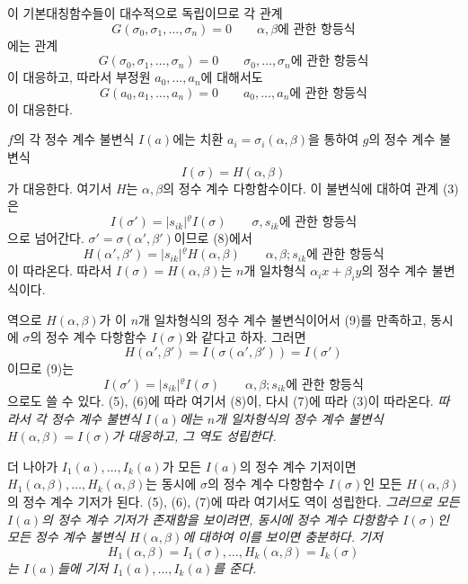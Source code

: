 이 기본대칭함수들이 대수적으로 독립이므로 각 관계
\begin{equation}
\tag{5}
G(\sigma_0,\sigma_1,\ldots,\sigma_n)=0
\qquad\text{\(\alpha,\beta\)에 관한 항등식}
\end{equation}
에는 관계
\begin{equation}
\tag{6}
G(\sigma_0,\sigma_1,\ldots,\sigma_n)=0
\qquad\text{\(\sigma_0,\ldots,\sigma_n\)에 관한 항등식}
\end{equation}
이 대응하고, 따라서 부정원 \(a_0,\ldots,a_n\)에 대해서도
\begin{equation}
\tag{7}
G(a_0,a_1,\ldots,a_n)=0
\qquad\text{\(a_0,\ldots,a_n\)에 관한 항등식}
\end{equation}
이 대응한다.

\(f\)의 각 정수 계수 불변식 \(I(a)\)에는 치환 \(a_i=\sigma_i(\alpha,\beta)\)을 통하여 \(g\)의 정수 계수 불변식
\[
I(\sigma)=H(\alpha,\beta)
\]
가 대응한다. 여기서 \(H\)는 \(\alpha,\beta\)의 정수 계수 다항함수이다. 이 불변식에 대하여 관계 (3)은
\begin{equation}
\tag{8}
I(\sigma')=|s_{ik}|^\varrho I(\sigma)
\qquad\text{\(\sigma,s_{ik}\)에 관한 항등식}
\end{equation}
으로 넘어간다. \(\sigma'=\sigma(\alpha',\beta')\)이므로 (8)에서
\begin{equation}
\tag{9}
H(\alpha',\beta')=|s_{ik}|^\varrho H(\alpha,\beta)
\qquad\text{\(\alpha,\beta;s_{ik}\)에 관한 항등식}
\end{equation}
이 따라온다. 따라서 \(I(\sigma)=H(\alpha,\beta)\)는 \(n\)개 일차형식 \(\alpha_i x+\beta_i y\)의 정수 계수 불변식이다.

역으로 \(H(\alpha,\beta)\)가 이 \(n\)개 일차형식의 정수 계수 불변식이어서 (9)를 만족하고, 동시에 \(\sigma\)의 정수 계수 다항함수 \(I(\sigma)\)와 같다고 하자. 그러면
\[
H(\alpha',\beta')=I(\sigma(\alpha',\beta'))=I(\sigma')
\]
이므로 (9)는
\begin{equation}
\tag{9a}
I(\sigma')=|s_{ik}|^\varrho I(\sigma)
\qquad\text{\(\alpha,\beta;s_{ik}\)에 관한 항등식}
\end{equation}
으로도 쓸 수 있다. (5), (6)에 따라 여기서 (8)이, 다시 (7)에 따라 (3)이 따라온다. \emph{따라서 각 정수 계수 불변식 \(I(a)\)에는 \(n\)개 일차형식의 정수 계수 불변식 \(H(\alpha,\beta)=I(\sigma)\)가 대응하고, 그 역도 성립한다.}

더 나아가 \(I_1(a),\ldots,I_k(a)\)가 모든 \(I(a)\)의 정수 계수 기저이면 \(H_1(\alpha,\beta),\ldots,H_k(\alpha,\beta)\)는 동시에 \(\sigma\)의 정수 계수 다항함수 \(I(\sigma)\)인 모든 \(H(\alpha,\beta)\)의 정수 계수 기저가 된다. (5), (6), (7)에 따라 여기서도 역이 성립한다. \emph{그러므로 모든 \(I(a)\)의 정수 계수 기저가 존재함을 보이려면, 동시에 정수 계수 다항함수 \(I(\sigma)\)인 모든 정수 계수 불변식 \(H(\alpha,\beta)\)에 대하여 이를 보이면 충분하다. 기저}
\[
H_1(\alpha,\beta)=I_1(\sigma),\ldots,H_k(\alpha,\beta)=I_k(\sigma)
\]
\emph{는 \(I(a)\)들에 기저 \(I_1(a),\ldots,I_k(a)\)를 준다.}

